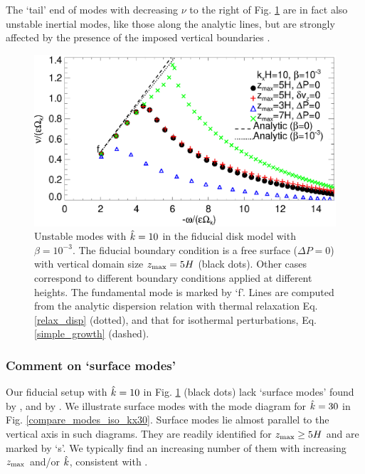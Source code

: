 The `tail' end of modes with decreasing $\nu$ to the right of
Fig. \ref{compare_modes_iso_kx10} are in fact also unstable inertial modes, like those
along the analytic lines, but are strongly affected by the presence of 
the imposed vertical boundaries \citep{barker15}. 


\begin{figure}
  \includegraphics[width=\linewidth]{figures/compare_modes_iso_kx10_analytic.ps}
  \caption{Unstable modes with $\hat{k}=10$ in the fiducial disk model
    with $\beta=10^{-3}$. %
    The fiducial boundary condition is a free surface ($\Delta P=0$)
    with vertical domain size $z_\mathrm{max}=5H$  (black dots).  Other
    cases correspond to different boundary conditions applied at
    different heights. The fundamental mode is marked by `f'. Lines
    are computed from the analytic dispersion relation 
    with thermal relaxation Eq. \ref{relax_disp} (dotted), and that for
    isothermal perturbations, Eq. \ref{simple_growth} (dashed). 
    \label{compare_modes_iso_kx10} 
  }
\end{figure}

\subsubsection{Comment on `surface modes'}\label{surf_comment} 
Our fiducial setup with $\hat{k}=10$ in 
Fig. \ref{compare_modes_iso_kx10} (black dots)  lack `surface modes'
found by \cite{nelson13}, \cite{mcnally14}  and 
by \cite{barker15}.  We illustrate surface modes with the mode
diagram for $\hat{k}=30$ in Fig. \ref{compare_modes_iso_kx30}. Surface
modes lie almost parallel to the vertical axis
in such diagrams. They are readily identified for  $z_\mathrm{max}\geq 5H$ and
are marked by `s'.  We typically find an increasing
number of them with increasing $z_\mathrm{max}$ and/or $\hat{k}$,
consistent with \cite{barker15}. 
 
